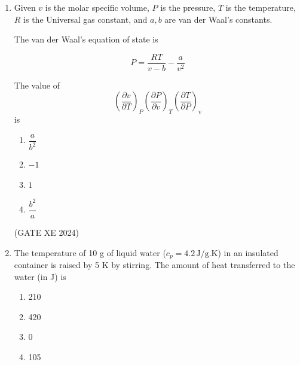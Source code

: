 \documentclass[12pt]{article}
\begin{document}
\begin{enumerate}
\textbf{Case A:} Sink is at temperature $T_{L,1}$  

\textbf{Case B:} Sink is at temperature $T_{L,2}$  

If $T_{L,1} < T_{L,2}$, which one of the following statements is TRUE?

\begin{enumerate}
\item The reversibility is the same, and the entropy generation is greater than zero for Cases A and B  
\item Case B is less reversible with the entropy generation greater than zero  
\item Case B is more reversible with the entropy generation greater than zero  
\item Case B is more reversible with the entropy generation equal to zero  
\end{enumerate}

(GATE XE 2024)

\item Given $v$ is the molar specific volume, $P$ is the pressure, $T$ is the temperature, $R$ is the Universal gas constant, and $a, b$ are van der Waal’s constants.  

The van der Waal’s equation of state is  

$$ P = \frac{RT}{v-b} - \frac{a}{v^2} $$  

The value of  
$$ \left(\frac{\partial v}{\partial T}\right)_{P} \left(\frac{\partial P}{\partial v}\right)_{T} \left(\frac{\partial T}{\partial P}\right)_{v} $$  
is  

\begin{enumerate}
\item $\dfrac{a}{b^2}$  
\item $-1$  
\item $1$  
\item $\dfrac{b^2}{a}$  
\end{enumerate}

(GATE XE 2024)

\item The temperature of 10 g of liquid water ($c_p = 4.2 \, \text{J/g.K}$) in an insulated container is raised by 5 K by stirring. The amount of heat transferred to the water (in J) is  

\begin{enumerate}
\item 210  
\item 420  
\item 0  
\item 105  
\end{enumerate}


\end{enumerate}
\end{document}
